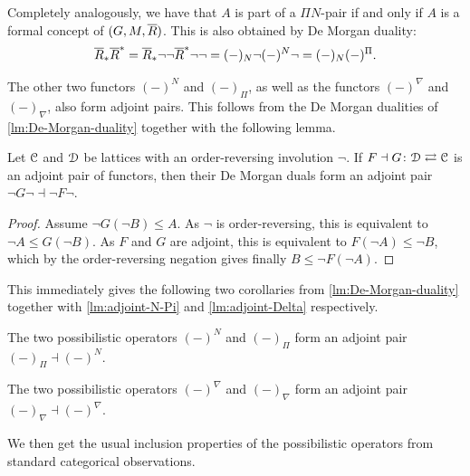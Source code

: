 \begin{remark}
    Completely analogously, we have that $A$ is part of a $\Pi N$-pair if and only if $A$ is a formal concept of $(G,M,\overline{R})$. This is also obtained by De Morgan duality: 
    \[\overline{R}_* \overline{R}^*= \overline{R}_*\neg\neg \overline{R}^* \neg\neg= (-)_N \neg (-)^N\neg = (-)_N (-)^\Pi.\]
\end{remark}

The other two functors $(-)^N$ and $(-)_\Pi$, as well as the functors $(-)^\nabla$ and $(-)_\nabla$, also form adjoint pairs. This follows from the De Morgan dualities of \cref{lm:De-Morgan-duality} together with the following lemma. 

\begin{lemma}
    Let $\EuScript{C}$ and $\EuScript{D}$ be lattices with an order-reversing involution $\neg$. If $F\dashv G\colon \EuScript{D} \rightleftarrows \EuScript{C}$ is an adjoint pair of functors, then their De Morgan duals form an adjoint pair $\neg G\neg \dashv \neg F\neg$. 
\end{lemma}
\begin{proof}
    Assume $\neg G(\neg B)\leq A$. As $\neg$ is order-reversing, this is equivalent to $\neg A \leq  G(\neg B)$. As $F$ and $G$ are adjoint, this is equivalent to $F(\neg A) \leq \neg B$, which by the order-reversing negation gives finally $B \leq \neg F(\neg A)$.
\end{proof}

This immediately gives the following two corollaries from \cref{lm:De-Morgan-duality} together with \cref{lm:adjoint-N-Pi} and \cref{lm:adjoint-Delta} respectively. 

\begin{corollary}
    \label{lm:adjoint-N-Pi}
    The two possibilistic operators $(-)^N$ and $(-)_\Pi$ form an adjoint pair $(-)_\Pi \dashv (-)^N$.
\end{corollary} 

\begin{corollary}
    \label{lm:adjoint-nabla}
    The two possibilistic operators $(-)^\nabla$ and $(-)_\nabla$ form an adjoint pair $(-)_\nabla \dashv (-)^\nabla$.
\end{corollary}

We then get the usual inclusion properties of the possibilistic operators from standard categorical observations. 

